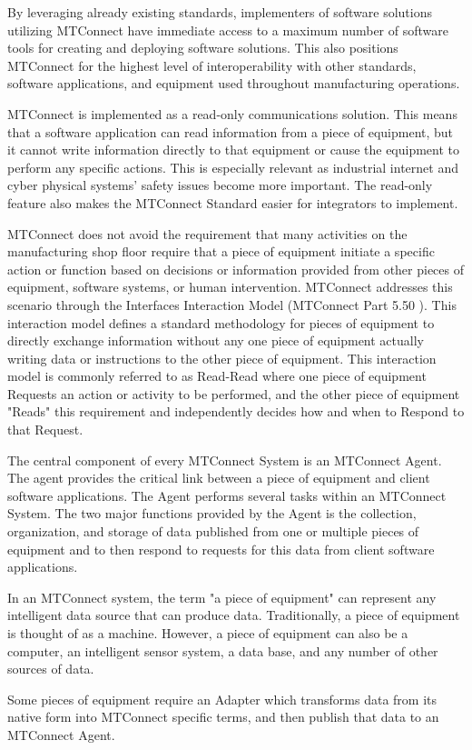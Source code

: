 By leveraging already existing standards, implementers of software solutions utilizing MTConnect have immediate access to a maximum number of software tools for creating and deploying software solutions.   This also positions MTConnect for the highest level of interoperability with other standards, software applications, and equipment used throughout manufacturing operations.    
 
MTConnect is implemented as a read-only communications solution.   This means that a software application can read information from a piece of equipment, but it cannot write information directly to that equipment or cause the equipment to perform any specific actions.  This is especially relevant as industrial internet and cyber physical systems' safety issues become more important.  The read-only feature also makes the MTConnect Standard easier for integrators to implement. 
 
MTConnect does not avoid the requirement that many activities on the manufacturing shop floor require that a piece of equipment initiate a specific action or function based on decisions or information provided from other pieces of equipment, software systems, or human intervention.   MTConnect addresses this scenario through the Interfaces Interaction Model (MTConnect Part 5.50 \cite{MTCPart5}).   This interaction model defines a standard methodology for pieces of equipment to directly exchange information without any one piece of equipment actually writing data or instructions to the other piece of equipment. This interaction model is commonly referred to as Read-Read where one piece of equipment Requests an action or activity to be performed, and the other piece of equipment "Reads" this requirement and independently decides how and when to Respond to that Request. 

The central component of every MTConnect System is an MTConnect Agent.  The agent provides the critical link between a piece of equipment and client software applications. The Agent performs several tasks within an MTConnect System.   The two major functions provided by the Agent is the collection, organization, and storage of data published from one or multiple pieces of equipment and to then respond to requests for this data from client software applications. 


\FloatBarrier
 
In an MTConnect system, the term "a piece of equipment" can represent any intelligent data source that can produce data.  Traditionally, a piece of equipment is thought of as a machine. However, a piece of equipment can also be a computer, an intelligent sensor system, a data base, and any number of other sources of data. 
 
Some pieces of equipment require an Adapter which transforms data from its native form into MTConnect specific terms, and then publish that data to an MTConnect Agent.